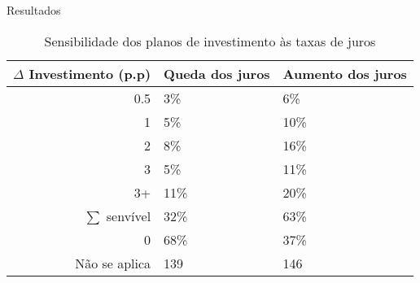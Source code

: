 \documentclass[presentation]{beamer}
\begin{document}
\begin{frame}[label={sec:orgda691ea}]{Resultados}
\begin{table}[htbp]
\caption{Sensibilidade dos planos de investimento às taxas de juros}
\centering
\begin{tabular}{rll}
\hline
\(\Delta\) Investimento (p.p) & Queda dos juros & Aumento dos juros\\
\hline
0.5 & 3\% & 6\%\\
1 & 5\% & 10\%\\
2 & 8\% & 16\%\\
3 & 5\% & 11\%\\
3+ & 11\% & 20\%\\
\hline
\(\sum\) senvível & 32\% & 63\%\\
\hline
0 & 68\% & 37\%\\
Não se aplica & 139 & 146\\
\hline
\end{tabular}
\end{table}
\end{frame}
\end{document}
